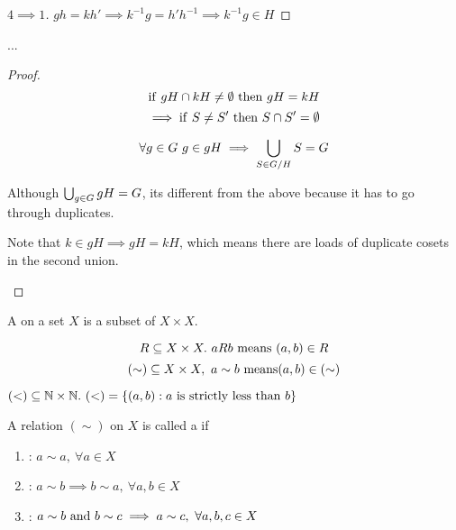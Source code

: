 \documentclass[12pt]{article}
\begin{document}
\bboxproof
\begin{proof}[\(4\implies 1\)]
    \(gh=kh'\implies k^{-1}g=h'h^{-1}\implies k^{-1}g\in H\)
\end{proof}
\ebox

\bboxcoro
\begin{coro}
    ...
\end{coro}
\ebox

\bboxproof
\begin{proof}
    \[
        \iif\ gH \intr kH \neq \emptyset\ 
        \tthen\ gH = kH
    \]
    \[
        \implies \mathrm{if}\ S\neq S'\ \mathrm{then}\ S\cap S' = \emptyset
    \]

    \[
        \forall g\in G\ g\in gH\implies\bigcup_{S\in G/H}S=G
    \]
    
    \bboxnote
    \begin{note}
        Although \(\bigcup_{g\in G}gH=G\), its different from
        the above because it has to go through duplicates.
        
        Note that \(k\in gH\implies gH=kH\), which means there are loads
        of duplicate cosets in the second union.
    \end{note}
    \ebox
\end{proof}
\ebox

\bboxdefn
\begin{defn}[Relation]
    A  on a set \(X\) is a subset of
    \(X\times X\).
\end{defn}
\ebox

\bboxnota
\begin{nota}
    \[
        R\ssq X\times X.\ aRb\ \TR{means}\ (a,b)\in R
    \]
    \[
        (\sim)\ssq X\times X,\ a \sim b\ \TR{means} (a,b)\in(\sim)
    \]
\end{nota}
\ebox

\bboxexam
\begin{exam}
    \((<)\ssq\N\times\N.\ (<)=\{(a,b):a\ \TR{is\ strictly\ less\ than}\ b\}\)
\end{exam}
\ebox

\bboxdefn
\begin{defn}
    A relation \((\sim)\) on \(X\) is called a 
     if
    \begin{enumerate}
        \item {}: \(a\sim a,\ \forall a\in X\)
        \item {}: \(a\sim b\implies b\sim a,\ \forall a,b\in X\)
        \item \TB{Transitivity}: \(a\sim b\ \mathrm{and}\ b\sim c\implies
            a\sim c,\ \forall a,b,c\in X\)
    \end{enumerate}
\end{defn}
\ebox
\end{document}
